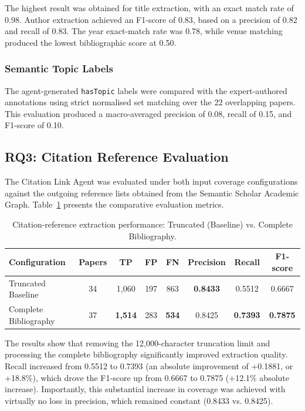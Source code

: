 \documentclass[runningheads]{llncs}
\begin{document}
The highest result was obtained for title extraction, with an exact match rate of 0.98. Author extraction achieved an F1-score of 0.83, based on a precision of 0.82 and recall of 0.83. The year exact-match rate was 0.78, while venue matching produced the lowest bibliographic score at 0.50.

\subsubsection{Semantic Topic Labels}
The agent-generated \texttt{hasTopic} labels were compared with the expert-authored annotations using strict normalised set matching over the 22 overlapping papers. This evaluation produced a macro-averaged precision of 0.08, recall of 0.15, and F1-score of 0.10.

\subsection{RQ3: Citation Reference Evaluation}
\label{sec:rq3_results}

The Citation Link Agent was evaluated under both input coverage configurations against the outgoing reference lists obtained from the Semantic Scholar Academic Graph. Table~\ref{tab:rq3_results} presents the comparative evaluation metrics.

\begin{table}[!htbp]
\centering
\caption{Citation-reference extraction performance: Truncated (Baseline) vs. Complete Bibliography.}
\label{tab:rq3_results}
\begin{tabular}{lccccccc}
\toprule
\textbf{Configuration} & \textbf{Papers} & \textbf{TP} & \textbf{FP} & \textbf{FN} & \textbf{Precision} & \textbf{Recall} & \textbf{F1-score} \\
\midrule
Truncated Baseline & 34 & 1,060 & 197 & 863 & \textbf{0.8433} & 0.5512 & 0.6667 \\
Complete Bibliography & 37 & \textbf{1,514} & 283 & \textbf{534} & 0.8425 & \textbf{0.7393} & \textbf{0.7875} \\
\bottomrule
\end{tabular}
\end{table}

The results show that removing the 12,000-character truncation limit and processing the complete bibliography significantly improved extraction quality. Recall increased from 0.5512 to 0.7393 (an absolute improvement of +0.1881, or +18.8\%), which drove the F1-score up from 0.6667 to 0.7875 (+12.1\% absolute increase). Importantly, this substantial increase in coverage was achieved with virtually no loss in precision, which remained constant (0.8433 vs. 0.8425). 
\end{document}
